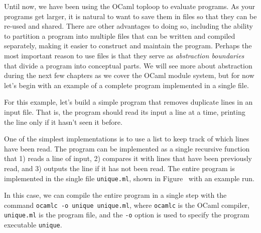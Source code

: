 %
%
%

Until now, we have been using the OCaml toploop to evaluate programs.  As
your programs get larger, it is natural to want to save them in files so
that they can be re-used and shared. There are other advantages to
doing so, including the ability to partition a program into multiple
files that can be written and compiled separately, making it easier to
construct and maintain the program. Perhaps the most important reason
to use files is that they serve as \emph{abstraction boundaries} that
divide a program into conceptual parts. We will see more about
abstraction during the next few chapters as we cover the OCaml module
system, but for now let's begin with an example of a complete program
implemented in a single file.


For this example, let's build a simple program that removes duplicate
lines in an input file. That is, the program should read its input a
line at a time, printing the line only if it hasn't seen it before.

One of the simplest implementations is to use a list to keep track of
which lines have been read. The program can be implemented as a single
recursive function that 1) reads a line of input, 2) compares it with
lines that have been previously read, and 3) outputs the line if it
has not been read. The entire program is implemented in the single
file \hbox{\lstinline/unique.ml/}, shown in Figure~
with an example run.

In this case, we can compile the entire program in a single step with
the command
%
\hbox{\lstinline/ocamlc -o unique unique.ml/},
%
where \hbox{\lstinline/ocamlc/} is the OCaml
compiler, \hbox{\lstinline/unique.ml/} is the program file, and
the \hbox{\lstinline/-o/} option is used to specify the program
executable \hbox{\lstinline/unique/}.

